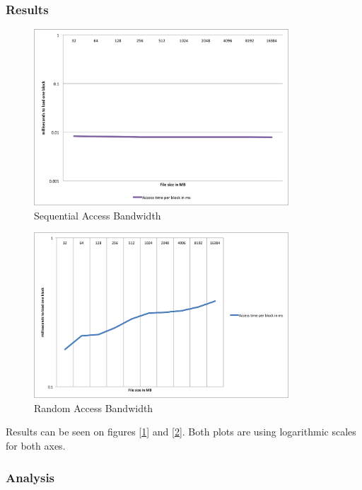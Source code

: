 \subsubsection{Results}

\begin{figure}
 \centering
  \includegraphics[width=0.85\textwidth]{image/sequential_read.png}
  \caption{Sequential Access Bandwidth}
 \label{fig:sequential}
\end{figure}

\begin{figure}
 \centering
  \includegraphics[width=0.85\textwidth]{image/random_read.png}
  \caption{Random Access Bandwidth}
 \label{fig:random}
\end{figure}

Results can be seen on figures [\ref{fig:sequential}] and [\ref{fig:random}]. Both plots are using logarithmic scales for both axes.

\subsubsection{Analysis}

